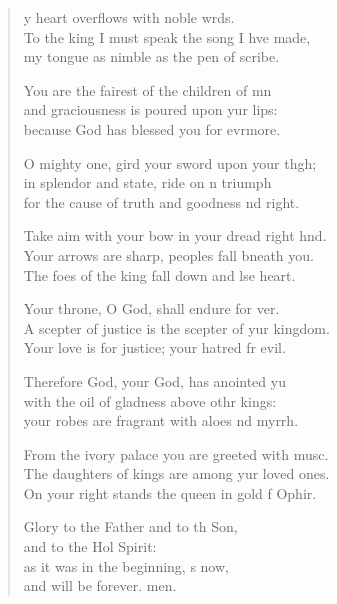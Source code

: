 \settowidth{\versewidth}{A scepter of justice is the scepter of your kingdom. *}
\begin{verse}%
  \begin{patverse}
y heart overflows with noble wrds.\Flex\\
To the king I must speak the song I hve made,\Med\\
my tongue as nimble as the pen of  scribe.

You are the fairest of the children of mn\Flex\\
and graciousness is poured upon yur lips:\Med\\
because God has blessed you for evrmore.

O mighty one, gird your sword upon your th\pointup{\i}gh;\Flex\\
in splendor and state, ride on \pointup{\i}n triumph\Med\\
for the cause of truth and goodness nd right.

Take aim with your bow in your dread right hnd.\Flex\\
Your arrows are sharp, peoples fall bneath you.\Med\\
The foes of the king fall down and lse heart.

Your throne, O God, shall endure for ver.\Flex\\
A scepter of justice is the scepter of yur kingdom.\Med\\
Your love is for justice; your hatred fr evil.

Therefore God, your God, has anointed yu\Flex\\
with the oil of gladness above othr kings:\Med\\
your robes are fragrant with aloes nd myrrh.

From the ivory palace you are greeted with mus\pointup{\i}c.\Flex\\
The daughters of kings are among yur loved ones.\Med\\
On your right stands the queen in gold f Ophir.

Glory to the Father and to th Son,\Med\\
and to the Hol Spirit:\\
as it was in the beginning, \pointup{\i}s now,\Med\\
and will be forever. men. 
  \end{patverse}
\end{verse}
